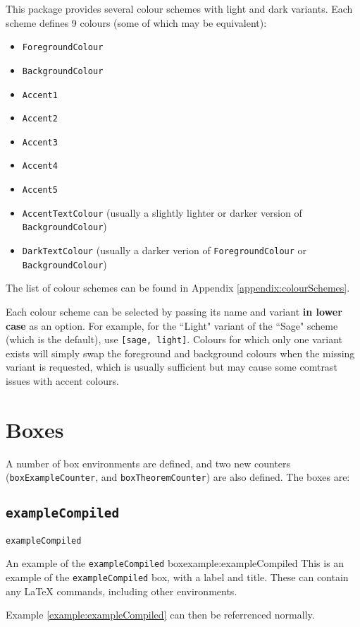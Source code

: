 \documentclass{article}
\begin{document}
This package provides several colour schemes with light and dark variants. Each scheme defines 9 colours (some of which may be equivalent):
\begin{itemize}
    \item \lstinline|ForegroundColour|
    \item \lstinline|BackgroundColour|
    \item \lstinline|Accent1|
    \item \lstinline|Accent2|
    \item \lstinline|Accent3|
    \item \lstinline|Accent4|
    \item \lstinline|Accent5|
    \item \lstinline|AccentTextColour| (usually a slightly lighter or darker version of \lstinline|BackgroundColour|)
    \item \lstinline|DarkTextColour| (usually a darker verion of \lstinline|ForegroundColour|
    or \lstinline|BackgroundColour|)
\end{itemize}

The list of colour schemes can be found in Appendix \ref{appendix:colourSchemes}.

Each colour scheme can be selected by passing its name and variant \textbf{in lower case} as an option. For example, for the ``Light" variant of the ``Sage" scheme (which is the default), use \lstinline|[sage, light]|. Colours for which only one variant exists will simply swap the foreground and background colours when the missing variant is requested, which is usually sufficient but may cause some comtrast issues with accent colours.

\section{Boxes}

A number of box environments are defined, and two new counters (\lstinline|boxExampleCounter|, and \lstinline|boxTheoremCounter|) are also defined. The boxes are:
\subsection*{\texttt{exampleCompiled}}
\begin{exampleCompiled*}{\texttt{exampleCompiled}}
\begin{exampleCompiled}{An example of the \texttt{exampleCompiled} box}{example:exampleCompiled}
This is an example of the \texttt{exampleCompiled} box, with a label and title. These can contain any \LaTeX{} commands, including other environments.
\end{exampleCompiled}
Example \ref{example:exampleCompiled} can then be referrenced normally.
\end{exampleCompiled*}
\end{document}
